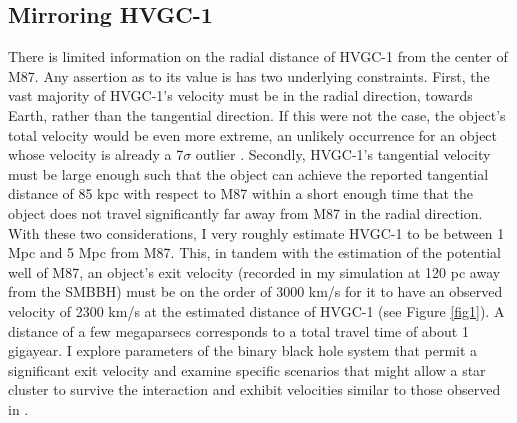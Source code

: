 \documentclass{aastex62}
\begin{document}
\subsection{Mirroring HVGC-1}
There is limited information on the radial distance of HVGC-1 from the center of M87. Any assertion as to its value is has two underlying constraints. First, the vast majority of HVGC-1's velocity must be in the radial direction, towards Earth, rather than the tangential direction. If this were not the case, the object's total  velocity would be even more extreme, an unlikely occurrence for an object whose velocity is already a 7$\sigma$ outlier  \citep{cald14}. Secondly, HVGC-1's tangential velocity must be large enough such that the object can achieve the reported tangential distance of 85 kpc with respect to M87 within a short enough time that the object does not travel significantly far away from M87 in the radial direction. With these two considerations, I very roughly estimate HVGC-1 to be between 1 Mpc and 5 Mpc from M87. This, in tandem with the estimation of the potential well of M87, an object's exit velocity (recorded in my simulation at 120 pc away from the SMBBH) must be on the order of 3000 km/s for it to have an observed velocity of 2300 km/s at the estimated distance of HVGC-1 (see Figure \ref{fig1}). A distance of a few megaparsecs corresponds to a total travel time of about 1 gigayear. I explore parameters of the binary black hole system that permit a significant exit velocity and examine specific scenarios that might allow a star cluster to survive the interaction and exhibit velocities similar to those observed in \citet{cald14}.
\end{document}
